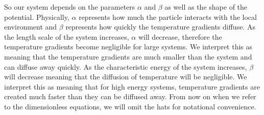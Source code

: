 So our system depends on the parameters $\alpha$ and $\beta$ as well as the shape of the potential. Physically, $\alpha$ represents how much the particle interacts with the local environment and $\beta$ represents how quickly the temperature gradients diffuse. As the length scale of the system increases, $\alpha$ will decrease, therefore the temperature gradients become negligible for large systems. We interpret this as meaning that the temperature gradients are much smaller than the system and can diffuse away quickly. As the characteristic energy of the system increases, $\beta$ will decrease meaning that the diffusion of temperature will be negligible. We interpret this as meaning that for high energy systems, temperature gradients are created much faster than they can be diffused away. From now on when we refer to the dimensionless equations, we will omit the hats for notational convenience.




